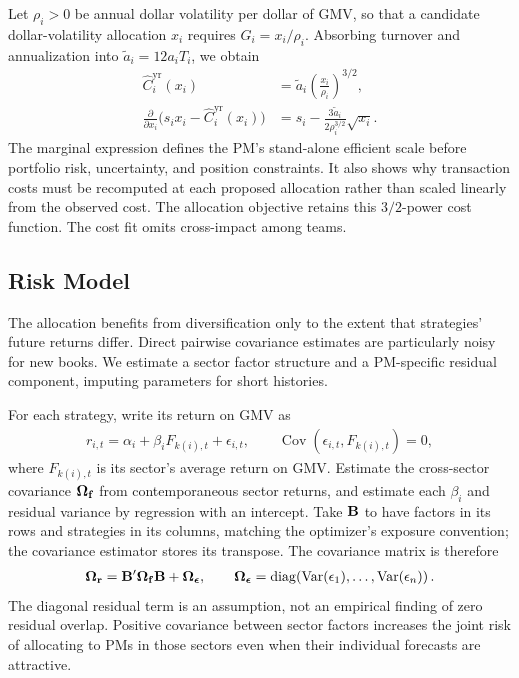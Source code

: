 \documentclass[11pt]{gappyarticle}
\begin{document}
Let $\rho_i>0$ be annual dollar volatility per dollar of GMV, so that a
candidate dollar-volatility allocation $x_i$ requires $G_i=x_i/\rho_i$.
Absorbing turnover and annualization into $\tilde a_i=12a_iT_i$, we obtain
\begin{align}
    \widehat C_i^{\mathrm{yr}}(x_i)
       &=\tilde a_i\left(\frac{x_i}{\rho_i}\right)^{3/2},\\
    \frac{\partial}{\partial x_i}
       \bigl(s_i x_i-\widehat C_i^{\mathrm{yr}}(x_i)\bigr)
       &=s_i-\frac{3\tilde a_i}{2\rho_i^{3/2}}\sqrt{x_i}.
\end{align}
The marginal expression defines the PM's stand-alone efficient scale before
portfolio risk, uncertainty, and position constraints. It also shows why
transaction costs must be recomputed at each proposed allocation rather than
scaled linearly from the observed cost. The allocation objective retains
this $3/2$-power cost function. The cost fit omits cross-impact among teams.

\subsection{Risk Model}
The allocation benefits from diversification only to the extent that
strategies' future returns differ. Direct pairwise covariance estimates are
particularly noisy for new books. We estimate a sector factor structure and
a PM-specific residual component, imputing parameters for short
histories.

For each strategy, write its return on GMV as
\begin{align}
    r_{i,t}=\alpha_i+\beta_i F_{k(i),t}+\epsilon_{i,t},
    \qquad \operatorname{Cov}(\epsilon_{i,t},F_{k(i),t})=0,
\end{align}
where $F_{k(i),t}$ is its sector's average return on GMV. Estimate the
cross-sector covariance ${\boldsymbol{\Omega}}_{\mathbf{f}}$ from contemporaneous sector returns,
and estimate each $\beta_i$ and residual variance by regression with an
intercept. Take ${\mathbf{B}}$ to have factors in its rows and strategies in its
columns, matching the optimizer's exposure convention; the covariance
estimator stores its transpose. The covariance matrix is therefore
\begin{align}
    {\boldsymbol{\Omega}}_{\mathbf{r}}
       ={\mathbf{B}}'{\boldsymbol{\Omega}}_{\mathbf{f}}{\mathbf{B}}+{\boldsymbol{\Omega}}_{\boldsymbol{\epsilon}},
       \qquad
    {\boldsymbol{\Omega}}_{\boldsymbol{\epsilon}}
       =\operatorname{diag}\!\left(
          \operatorname{Var}(\epsilon_1),\ldots,
          \operatorname{Var}(\epsilon_n)\right).
\end{align}
The diagonal residual term is an assumption, not an empirical finding of zero
residual overlap. Positive covariance between sector factors increases the
joint risk of allocating to PMs in those sectors even when their individual
forecasts are attractive.
\end{document}
